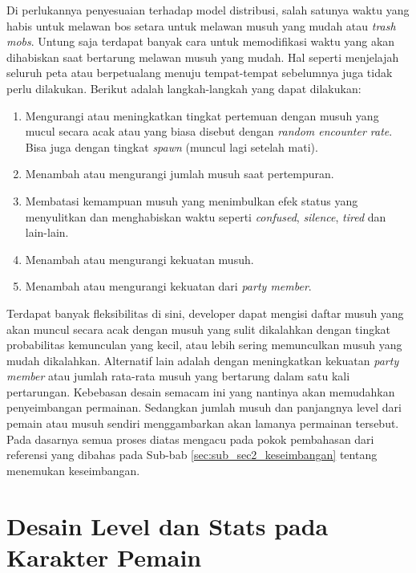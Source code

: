 \begin{enumerate}[label=\textbf{\arabic*).}]
	Di perlukannya penyesuaian terhadap model distribusi, salah satunya waktu yang habis untuk melawan bos setara untuk melawan musuh yang mudah atau \textit{trash mobs}. Untung saja terdapat banyak cara untuk memodifikasi waktu yang akan dihabiskan saat bertarung melawan musuh yang mudah. Hal seperti menjelajah seluruh peta atau berpetualang menuju tempat-tempat sebelumnya juga tidak perlu dilakukan. Berikut adalah langkah-langkah yang dapat dilakukan:

	\begin{enumerate} [label=\alph*).]
		\item  Mengurangi atau meningkatkan tingkat pertemuan dengan musuh yang mucul secara acak atau yang biasa disebut dengan \textit{random encounter rate}. Bisa juga dengan tingkat \textit{spawn} (muncul lagi setelah mati).
		\item Menambah atau mengurangi jumlah musuh saat pertempuran.
		\item Membatasi kemampuan musuh yang menimbulkan efek status yang menyulitkan dan menghabiskan waktu seperti \textit{confused}, \textit{silence}, \textit{tired} dan lain-lain.
		\item Menambah atau mengurangi kekuatan musuh.
		\item Menambah atau mengurangi kekuatan dari \textit{party member}.
	\end{enumerate}
\end{enumerate}

Terdapat banyak fleksibilitas di sini, developer dapat mengisi daftar musuh yang akan muncul secara acak dengan musuh yang sulit dikalahkan dengan tingkat probabilitas kemunculan yang kecil, atau lebih sering memunculkan musuh yang mudah dikalahkan. Alternatif lain adalah dengan meningkatkan kekuatan \textit{party member} atau jumlah rata-rata musuh yang bertarung dalam satu kali pertarungan. Kebebasan desain semacam ini yang nantinya akan memudahkan penyeimbangan permainan. Sedangkan jumlah musuh dan panjangnya level dari pemain atau musuh sendiri menggambarkan akan lamanya permainan tersebut. Pada dasarnya semua proses diatas mengacu pada pokok pembahasan dari referensi yang dibahas pada Sub-bab \ref{sec:sub_sec2_keseimbangan} tentang menemukan keseimbangan.
\vspace{1ex}

\section{Desain Level dan Stats pada Karakter Pemain}
\label{sec:sec3_player_stats}
\vspace{1ex}

